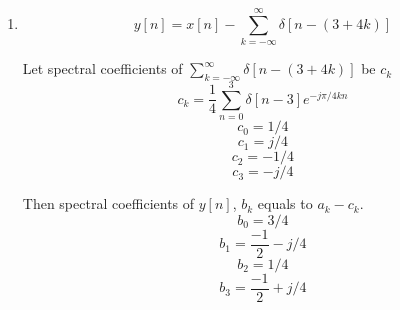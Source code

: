\documentclass[10pt,a4paper, margin=1in]{article}
\begin{document}
\begin{enumerate}
\begin{enumerate}
    \item %
        \begin{equation*}
            y[n] = x[n] - \sum_{k=-\infty}^{\infty} \delta [n - (3+4k)]
        \end{equation*}

        Let spectral coefficients of $\sum_{k=-\infty}^{\infty} \delta [n - (3+4k)]$ be $c_k$
        \begin{equation*}
            c_k = \frac{1}{4} \sum_{n=0}^{3}\delta[n-3]e^{-j\pi / 4kn}
        \end{equation*}
        \begin{equation*}
            c_0 = 1/4
        \end{equation*}
        \begin{equation*}
            c_1 = j/4
        \end{equation*}
        \begin{equation*}
            c_2 = -1/4
        \end{equation*}
        \begin{equation*}
            c_3 = -j/4
        \end{equation*}

        Then spectral coefficients of $y[n]$, $b_k$ equals to $a_k - c_k$.
        \begin{equation*}
            b_0 = 3/4
        \end{equation*}
        \begin{equation*}
            b_1 = \frac{-1}{2} - j/4
        \end{equation*}
        \begin{equation*}
            b_2 = 1/4
        \end{equation*}
        \begin{equation*}
            b_3 = \frac{-1}{2} + j/4
        \end{equation*}

        \begin{figure}[!htbp]
        \begin{center}
\end{center}
\end{figure}
\end{enumerate}
\end{enumerate}
\end{document}
